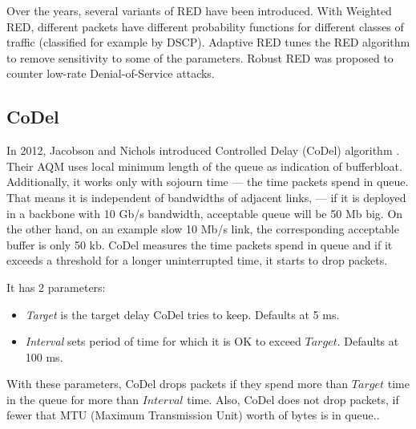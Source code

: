 Over the years, several variants of RED have been introduced. With Weighted RED, different packets have different probability functions for different classes of traffic (classified for example by DSCP). Adaptive RED \cite{Floyd01adaptivered:} tunes the RED algorithm to remove sensitivity to some of the parameters. Robust RED \cite{RRED} was proposed to counter low-rate Denial-of-Service attacks.


\subsection{CoDel}
\label{CoDel}
In 2012, Jacobson and Nichols introduced Controlled Delay (CoDel) algorithm \cite{CoDel}. Their AQM uses local minimum length  of the queue as indication of bufferbloat. Additionally, it works only with sojourn time --- the time packets spend in queue. That means  it is independent of bandwidths of adjacent links,  --- if it is deployed in a backbone\XX{,} with 10 Gb/s bandwidth, acceptable queue will be 50 Mb big. On the other hand, on an example slow 10 Mb/s link, the corresponding acceptable buffer is only 50 kb. CoDel measures the time packets spend in queue and if it exceeds a threshold for a longer uninterrupted time, it starts to drop packets.

It  has 2 parameters:
\begin{itemize}
	\item \emph{Target}  is the target delay CoDel tries to keep. Defaults at 5 ms. 
	\item \emph{Interval} sets period of time for which it is OK to exceed $Target$. Defaults at 100 ms.
\end{itemize}
With these parameters, CoDel drops packets if they spend more than $Target$ time in the queue for more than $Interval$ time. Also, CoDel does not drop packets, if fewer that MTU (Maximum Transmission Unit) worth of bytes is in queue..

